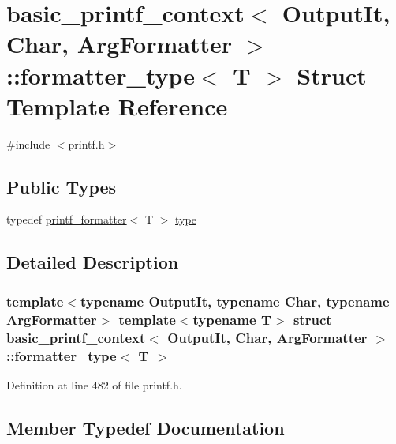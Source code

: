 \hypertarget{structbasic__printf__context_1_1formatter__type}{}\section{basic\+\_\+printf\+\_\+context$<$ Output\+It, Char, Arg\+Formatter $>$\+:\+:formatter\+\_\+type$<$ T $>$ Struct Template Reference}
\label{structbasic__printf__context_1_1formatter__type}


{\ttfamily \#include $<$printf.\+h$>$}

\subsection*{Public Types}
\begin{DoxyCompactItemize}
\item 
typedef \hyperlink{structprintf__formatter}{printf\+\_\+formatter}$<$ T $>$ \hyperlink{structbasic__printf__context_1_1formatter__type_a2c01e0b65235ce00308de48f6b602f7c}{type}
\end{DoxyCompactItemize}


\subsection{Detailed Description}
\subsubsection*{template$<$typename Output\+It, typename Char, typename Arg\+Formatter$>$\newline
template$<$typename T$>$\newline
struct basic\+\_\+printf\+\_\+context$<$ Output\+It, Char, Arg\+Formatter $>$\+::formatter\+\_\+type$<$ T $>$}



Definition at line 482 of file printf.\+h.



\subsection{Member Typedef Documentation}
\mbox{\label{structbasic__printf__context_1_1formatter__type_a2c01e0b65235ce00308de48f6b602f7c}} 
